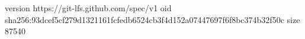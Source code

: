 version https://git-lfs.github.com/spec/v1
oid sha256:93dcef5cf279d1321161fcfedb6524cb3f4d152a07447697f6f8bc374b32f50c
size 87540
